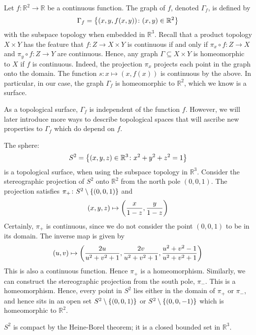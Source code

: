 \begin{example}
	Let \( f \colon \mathbb R^2 \to \mathbb R \) be a continuous function.
	The graph of \( f \), denoted \( \Gamma_f \), is defined by
	\[ \Gamma_f = \qty{(x,y,f(x,y)) \colon (x,y) \in \mathbb R^2} \]
	with the subspace topology when embedded in \( \mathbb R^3 \).
	Recall that a product topology \( X \times Y \) has the feature that \( f \colon Z \to X \times Y \) is continuous if and only if \( \pi_x \circ f \colon Z \to X \) and \( \pi_y \circ f \colon Z \to Y \) are continuous.
	Hence, any graph \( \Gamma \subseteq X \times Y \) is homeomorphic to \( X \) if \( f \) is continuous.
	Indeed, the projection \( \pi_x \) projects each point in the graph onto the domain.
	The function \( s \colon x \mapsto (x,f(x)) \) is continuous by the above.
	In particular, in our case, the graph \( \Gamma_f \) is homeomorphic to \( \mathbb R^2 \), which we know is a surface.
\end{example}
\begin{remark}
	As a topological surface, \( \Gamma_f \) is independent of the function \( f \).
	However, we will later introduce more ways to describe topological spaces that will ascribe new properties to \( \Gamma_f \) which do depend on \( f \).
\end{remark}
\begin{example}
	The sphere:
	\[ S^2 = \qty{(x,y,z) \in \mathbb R^3 \colon x^2 + y^2 + z^2 = 1} \]
	is a topological surface, when using the subspace topology in \( \mathbb R^3 \).
	Consider the stereographic projection of \( S^2 \) onto \( \mathbb R^2 \) from the north pole \( (0,0,1) \).
	The projection satisfies \( \pi_+ \colon S^2 \setminus \qty{(0,0,1)} \) and
	\[ (x,y,z) \mapsto \qty(\frac{x}{1-z}, \frac{y}{1-z}) \]
	Certainly, \( \pi_+ \) is continuous, since we do not consider the point \( (0,0,1) \) to be in its domain.
	The inverse map is given by
	\[ (u,v) \mapsto \qty(\frac{2u}{u^2+v^2+1}, \frac{2v}{u^2+v^2+1}, \frac{u^2+v^2-1}{u^2+v^2+1}) \]
	This is also a continuous function.
	Hence \( \pi_+ \) is a homeomorphism.
	Similarly, we can construct the stereographic projection from the south pole, \( \pi_- \).
	This is a homeomorphism.
	Hence, every point in \( S^2 \) lies either in the domain of \( \pi_+ \) or \( \pi_- \), and hence sits in an open set \( S^2 \setminus \qty{(0,0,1)} \) or \( S^2 \setminus \qty{(0,0,-1)} \) which is homeomorphic to \( \mathbb R^2 \).
\end{example}
\begin{remark}
	\( S^2 \) is compact by the Heine-Borel theorem; it is a closed bounded set in \( \mathbb R^3 \).
\end{remark}
